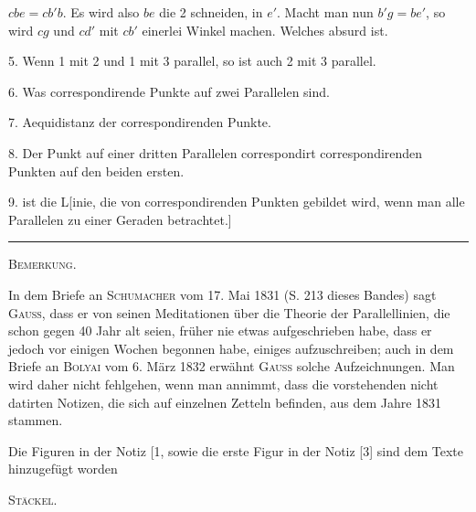 $cbe = cb'b$. Es wird also $be$ die 2 schneiden, in $e'$. Macht man nun $b'g = be'$, so wird $cg$ und $cd'$ mit $cb'$ einerlei Winkel machen. Welches absurd ist.

5. Wenn 1 mit 2 und 1 mit 3 parallel, so ist auch 2 mit 3 parallel.

6. Was correspondirende Punkte auf zwei Parallelen sind.

7. Aequidistanz der correspondirenden Punkte.

8. Der Punkt auf einer dritten Parallelen correspondirt correspondirenden Punkten auf den beiden ersten.

9.  ist die L[inie, die von correspondirenden Punkten gebildet wird, wenn man alle Parallelen zu einer Geraden betrachtet.]

\bigskip
\begin{center}
\rule{2.5cm}{0.4pt}

\textsc{Bemerkung.}
\end{center}

In dem Briefe an \textsc{Schumacher} vom 17. Mai 1831 (S. 213 dieses Bandes) sagt \textsc{Gauss}, dass er von seinen Meditationen über die Theorie der Parallellinien, die schon gegen 40 Jahr alt seien, früher nie etwas aufgeschrieben habe, dass er jedoch vor einigen Wochen begonnen habe, einiges aufzuschreiben; auch in dem Briefe an \textsc{Bolyai} vom 6. März 1832 erwähnt \textsc{Gauss} solche Aufzeichnungen. Man wird daher nicht fehlgehen, wenn man annimmt, dass die vorstehenden nicht datirten Notizen, die sich auf einzelnen Zetteln befinden, aus dem Jahre 1831 stammen.

Die Figuren in der Notiz [1, sowie die erste Figur in der Notiz [3] sind dem Texte hinzugefügt worden

\hfill \textsc{Stäckel}.

